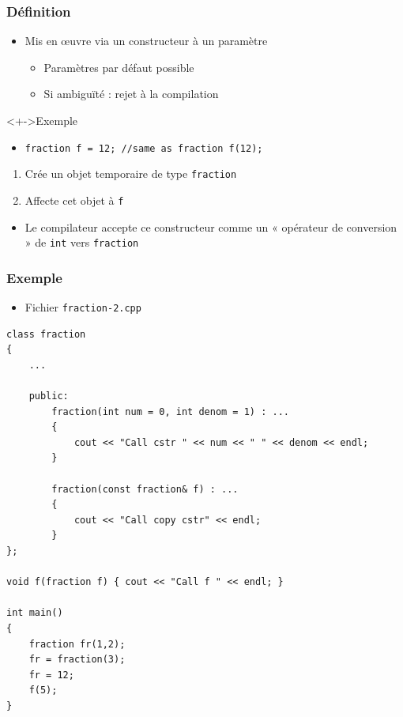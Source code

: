 \begin{frame}
\frametitle{Définition}
\begin{itemize}[<+->]
\item Mis en œuvre via un constructeur à un paramètre
	\begin{itemize}
	\item Paramètres par défaut possible
	\item Si ambiguïté : rejet à la compilation
	\end{itemize}
\end{itemize}
\begin{exampleblock}<+->{Exemple}
	\begin{itemize}[<+->]
	\item \lstinline|fraction f = 12; //same as fraction f(12);|
	\end{itemize}
\end{exampleblock}
\begin{enumerate}[<+->]
\item Crée un objet temporaire de type \texttt{fraction}
\item Affecte cet objet à \texttt{f}
\end{enumerate}
\begin{itemize}[<+->]
\item Le compilateur accepte ce constructeur comme un « opérateur de conversion » de \lstinline|int| vers \texttt{fraction}
\end{itemize}
\end{frame}

\begin{frame}[containsverbatim]
\frametitle{Exemple}
\begin{itemize}
\item Fichier \texttt{fraction-2.cpp}
\end{itemize}
\begin{lstlisting}
class fraction
{
	...

	public:
		fraction(int num = 0, int denom = 1) : ...
		{
			cout << "Call cstr " << num << " " << denom << endl;
		}		

		fraction(const fraction& f) : ...
		{
			cout << "Call copy cstr" << endl;
		}
};

void f(fraction f) { cout << "Call f " << endl; }

int main()
{
	fraction fr(1,2);
	fr = fraction(3);
	fr = 12;
	f(5);
}
\end{lstlisting}
\end{frame}

